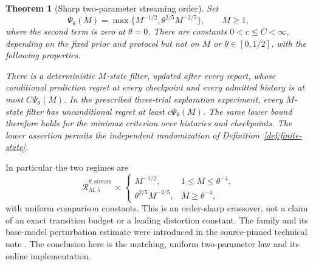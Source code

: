 \documentclass[11pt]{amsart}
\newtheorem{theorem}{Theorem}[section]
\theoremstyle{definition}\newtheorem{definition}[theorem]{Definition}
\theoremstyle{remark}\newtheorem{remark}[theorem]{Remark}
\begin{document}
\begin{theorem}[Sharp two-parameter streaming order]\label{thm:uniform-streaming}
Set
\begin{equation}\label{eq:five-resolution}
 \Psi_\theta(M)=\max\{M^{-1/2},\theta^{2/5}M^{-2/5}\},
 \qquad M\ge1,
\end{equation}
where the second term is zero at $\theta=0$. There are constants
$0<c\le C<\infty$, depending on the fixed prior and protocol but not on
$M$ or $\theta\in[0,1/2]$, with the following properties.

There is a deterministic $M$-state filter, updated after every report,
whose conditional prediction regret at every checkpoint and every
admitted history is at most $C\Psi_\theta(M)$. In the prescribed
three-trial exploration experiment, every $M$-state filter has
unconditional regret at least $c\Psi_\theta(M)$. The same lower bound
therefore holds for the minimax criterion over histories and checkpoints.
The lower assertion permits the independent randomization of
Definition~\ref{def:finite-state}.
\end{theorem}

In particular the two regimes are
\begin{equation}\label{eq:two-regimes}
 \overline{\mathcal R}^{\theta,\mathrm{stream}}_{M,5}\asymp
 \begin{cases}
 M^{-1/2},&1\le M\le\theta^{-4},\\
 \theta^{2/5}M^{-2/5},&M\ge\theta^{-4},
 \end{cases}
\end{equation}
with uniform comparison constants. This is an order-sharp crossover, not
a claim of an exact transition budget or a leading distortion constant.
The family and its base-model perturbation estimate were introduced in
the source-pinned technical note \cite{A1v6note}. The conclusion here is
the matching, uniform two-parameter law and its online implementation.
\end{document}
